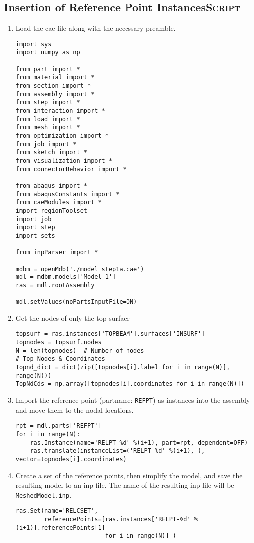 \documentclass[11pt]{article}
\begin{document}
\subsection{Insertion of Reference Point Instances\hfill{}\textsc{Script}}
\label{sec:insrpt}
\begin{enumerate}
\item Load the cae file along with the necessary preamble.
\begin{verbatim}
import sys
import numpy as np

from part import *
from material import *
from section import *
from assembly import *
from step import *
from interaction import *
from load import *
from mesh import *
from optimization import *
from job import *
from sketch import *
from visualization import *
from connectorBehavior import *

from abaqus import *
from abaqusConstants import *
from caeModules import * 
import regionToolset
import job
import step
import sets

from inpParser import *

mdbm = openMdb('./model_step1a.cae')
mdl = mdbm.models['Model-1']
ras = mdl.rootAssembly

mdl.setValues(noPartsInputFile=ON)
\end{verbatim}
\item Get the nodes of only the top surface
\begin{verbatim}
topsurf = ras.instances['TOPBEAM'].surfaces['INSURF']
topnodes = topsurf.nodes
N = len(topnodes)  # Number of nodes
# Top Nodes & Coordinates
Topnd_dict = dict(zip([topnodes[i].label for i in range(N)], range(N)))
TopNdCds = np.array([topnodes[i].coordinates for i in range(N)])
\end{verbatim}
\item Import the reference point (partname: \texttt{REFPT}) as instances into the assembly and move them to the nodal locations.
\begin{verbatim}
rpt = mdl.parts['REFPT']
for i in range(N):
    ras.Instance(name='RELPT-%d' %(i+1), part=rpt, dependent=OFF)
    ras.translate(instanceList=('RELPT-%d' %(i+1), ), vector=topnodes[i].coordinates)
\end{verbatim}
\item Create a set of the reference points, then simplify the model, and save the resulting model to an inp file.
The name of the resulting inp file will be \texttt{MeshedModel.inp}.
\begin{verbatim}
ras.Set(name='RELCSET',
        referencePoints=[ras.instances['RELPT-%d' %(i+1)].referencePoints[1]
                         for i in range(N)] )


\end{verbatim}
\end{enumerate}
\end{document}

